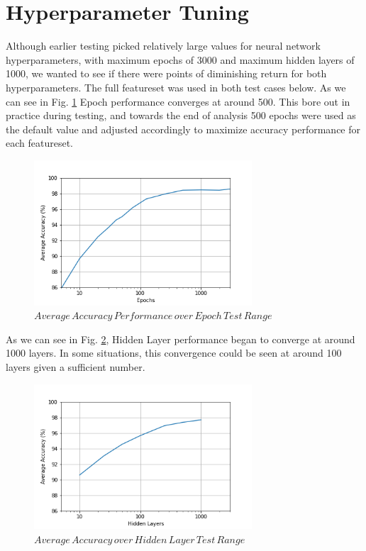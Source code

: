 \documentclass[conference]{IEEEtran}
\begin{document}
\section{Hyperparameter Tuning}

Although earlier testing picked relatively large values for neural network hyperparameters, with maximum epochs of 3000 and maximum hidden layers of 1000, we wanted to see if there were points of diminishing return for both hyperparameters. The full featureset was used in both test cases below. As we can see in Fig. \ref{fig:EpochPerf} Epoch performance converges at around 500. This bore out in practice during testing, and towards the end of analysis 500 epochs were used as the default value and adjusted accordingly to maximize accuracy performance for each featureset.

\begin{figure}[htb]
\centering
\includegraphics[width=3.2in]{figures/70_aa_vs_epoch.png}
\caption{$Average\,Accuracy\,Performance\,over\,Epoch\,Test\,Range$}
\label{fig:EpochPerf}
\end{figure}

As we can see in Fig. \ref{fig:LayerPerf}, Hidden Layer performance began to converge at around 1000 layers. In some situations, this convergence could be seen at around 100 layers given a sufficient number.

\begin{figure}[htb]
\centering
\includegraphics[width=3.2in]{figures/71_aa_vs_layers.png}
\caption{$Average\,Accuracy\,over\,Hidden\,Layer\,Test\,Range$}
\label{fig:LayerPerf}
\end{figure}
\end{document}
